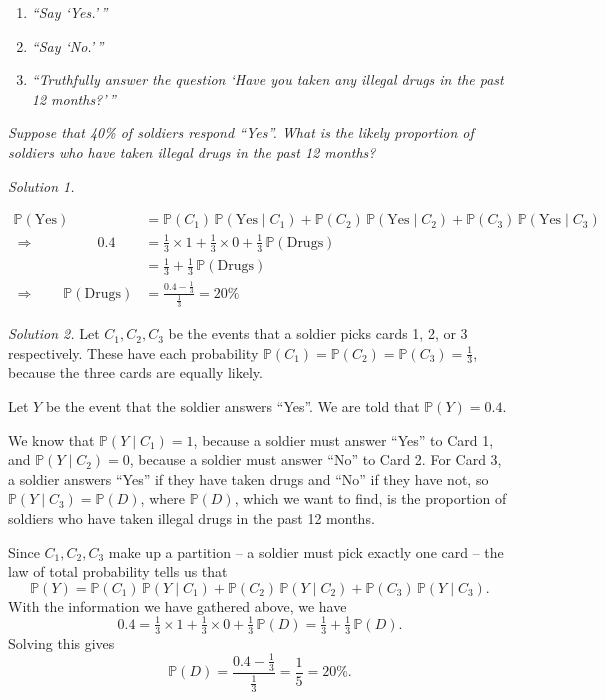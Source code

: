 \documentclass[
  a4paper,
]{book}
\providecommand{\tightlist}{%
  \setlength{\itemsep}{0pt}\setlength{\parskip}{0pt}}
\theoremstyle{definition}
\theoremstyle{definition}
\theoremstyle{definition}
\theoremstyle{definition}
\theoremstyle{remark}
\begin{document}
\begin{enumerate}
\def\labelenumi{\arabic{enumi}.}
\tightlist
\item
  \emph{``Say `Yes.'\,''}
\item
  \emph{``Say `No.'\,''}
\item
  \emph{``Truthfully answer the question `Have you taken any illegal drugs in the past 12 months?'\,''}
\end{enumerate}

\emph{Suppose that 40\% of soldiers respond ``Yes''. What is the likely proportion of soldiers who have taken illegal drugs in the past 12 months?}

\emph{Solution 1.}

\begin{align*} \mathbb P(\text{Yes}) &= \mathbb P(C_1)\,\mathbb P(\text{Yes} \mid C_1) + \mathbb P(C_2)\,\mathbb P(\text{Yes} \mid C_2) + 
\mathbb P(C_3)\,\mathbb P(\text{Yes} \mid C_3) \\
\Rightarrow \qquad\qquad\  \  0.4 &= \tfrac13 \times 1 + \tfrac13 \times 0 + \tfrac13 \, \mathbb P(\text{Drugs}) \\
&=\tfrac13 + \tfrac13 \,\mathbb P(\text{Drugs})  \\
\Rightarrow \qquad \mathbb P(\text{Drugs}) &= \frac{0.4 - \frac13}{\frac13} = 20\%
\end{align*}

\emph{Solution 2.}
Let \(C_1, C_2, C_3\) be the events that a soldier picks cards 1, 2, or 3 respectively. These have each probability \(\mathbb P(C_1) = \mathbb P(C_2) = \mathbb P(C_3) = \frac13\), because the three cards are equally likely.

Let \(Y\) be the event that the soldier answers ``Yes''. We are told that \(\mathbb P(Y) = 0.4\).

We know that \(\mathbb P(Y \mid C_1) = 1\), because a soldier must answer ``Yes'' to Card 1, and \(\mathbb P(Y \mid C_2) = 0\), because a soldier must answer ``No'' to Card 2. For Card 3, a soldier answers ``Yes'' if they have taken drugs and ``No'' if they have not, so \(\mathbb P(Y \mid C_3) = \mathbb P(D)\), where \(\mathbb P(D)\), which we want to find, is the proportion of soldiers who have taken illegal drugs in the past 12 months.

Since \(C_1, C_2, C_3\) make up a partition -- a soldier must pick exactly one card -- the law of total probability tells us that
\[ \mathbb P(Y) = \mathbb P(C_1)\,\mathbb P(Y \mid C_1) + \mathbb P(C_2)\,\mathbb P(Y \mid C_2) + 
\mathbb P(C_3)\,\mathbb P(Y \mid C_3) .\]
With the information we have gathered above, we have
\[ 0.4 = \tfrac13 \times 1 + \tfrac13 \times 0 + \tfrac13 \, \mathbb P(D) = \tfrac13 + \tfrac13 \,\mathbb P(D)  . \]
Solving this gives
\[ \mathbb P(D) = \frac{0.4 - \frac13}{\frac13} = \frac15 = 20\% . \]
\end{document}
